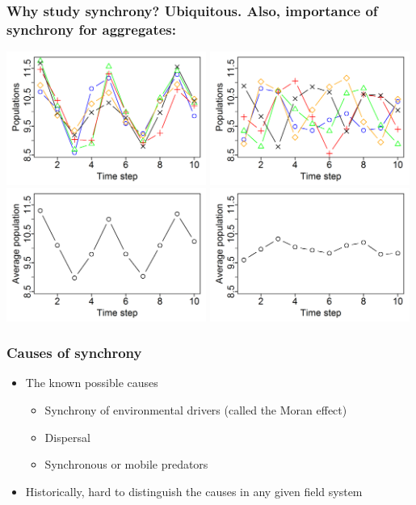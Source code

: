 \documentclass{beamer}
\begin{document}
\begin{frame}
\frametitle{Why study synchrony? Ubiquitous. Also, importance of synchrony for aggregates:}
\includegraphics[width= 0.49\textwidth]{figures/Sync.png}
\includegraphics[width= 0.49\textwidth]{figures/Asyn.png}\\
\includegraphics[width= 0.49\textwidth]{figures/SyncAvg.png}
\includegraphics[width= 0.49\textwidth]{figures/AsynAvg.png}
\end{frame}

\begin{frame}
\frametitle{Causes of synchrony}
\begin{itemize}
\item The known possible causes
\begin{itemize}
\item Synchrony of environmental drivers (called the Moran effect)
\item Dispersal
\item Synchronous or mobile predators
\end{itemize}
\item Historically, hard to distinguish the causes in any given field system
\end{itemize}
\end{frame}
\end{document}
